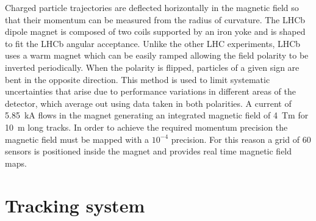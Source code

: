 Charged particle trajectories are deflected horizontally in the magnetic field
so that their momentum can be measured from the radius of curvature.
The LHCb dipole magnet is composed of two coils supported by an iron yoke
and is shaped to fit the LHCb angular acceptance. Unlike the other LHC experiments,
LHCb uses a warm magnet which can be easily ramped allowing the field polarity to be inverted periodically.
When the polarity is flipped, particles of a given sign are bent in the opposite direction.
This method is used to limit systematic uncertainties that arise due to performance
variations in different areas of the detector, which average out using data taken in both polarities.
A current of 5.85~kA flows in the magnet generating an integrated magnetic field of 4~Tm for 10~m long tracks.
In order to achieve the required momentum precision the magnetic field must be mapped with
a $10^{-4}$ precision. For this reason a grid of 60 sensors is positioned inside the magnet
and provides real time magnetic field maps.

\section{Tracking system}
\label{sec:tracking}

